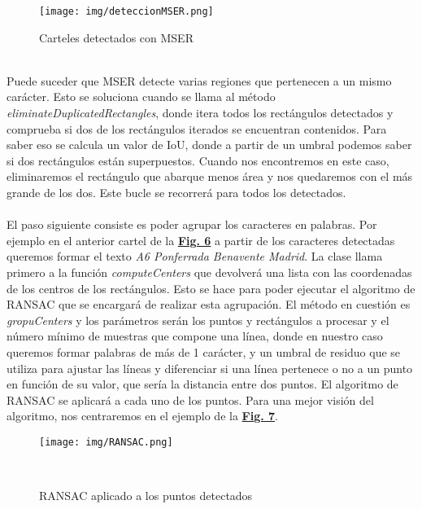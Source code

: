 \documentclass[a4paper, 12pt]{article}
\begin{document}
\begin{figure}[h]
	\centering
	\texttt{[image: img/deteccionMSER.png]}
 	\caption{Carteles detectados con MSER}\vspace{0.5cm}
	\label{fig:normalizacion}
\end{figure}
\\Puede suceder que MSER detecte varias regiones que pertenecen a un mismo carácter. Esto se soluciona cuando se llama al método \textit{eliminateDuplicatedRectangles}, donde itera todos los rectángulos detectados y comprueba si dos de los rectángulos iterados se encuentran contenidos. Para saber eso se calcula un valor de IoU, donde a partir de un umbral podemos saber si dos rectángulos están superpuestos. Cuando nos encontremos en este caso, eliminaremos el rectángulo que abarque menos área y nos quedaremos con el más grande de los dos. Este bucle se recorrerá para todos los detectados.
\\\\
El paso siguiente consiste es poder agrupar los caracteres en palabras. Por ejemplo en el anterior cartel de la \textbf{\hyperref[fig:normalizacion]{Fig. 6}} a partir de los caracteres detectadas queremos formar el texto \textit{A6 Ponferrada Benavente Madrid}. La clase llama primero a la función \textit{computeCenters} que devolverá una lista con las coordenadas de los centros de los rectángulos. Esto se hace para poder ejecutar el algoritmo de RANSAC que se encargará de realizar esta agrupación. El método en cuestión es \textit{gropuCenters} y los parámetros serán los puntos y rectángulos a procesar y el número mínimo de muestras que compone una línea, donde en nuestro caso queremos formar palabras de más de 1 carácter, y un umbral de residuo que se utiliza para ajustar las líneas y diferenciar si una línea pertenece o no a un punto en función de su valor, que sería la distancia entre dos puntos. El algoritmo de RANSAC se aplicará a cada uno de los puntos. Para una mejor visión del algoritmo, nos centraremos en el ejemplo de la \textbf{\hyperref[fig:normalizacion]{Fig. 7}}.
\begin{figure}[h]
	\centering
	\texttt{[image: img/RANSAC.png]}
 	\caption{RANSAC aplicado a los puntos detectados}\
	\label{fig:normalizacion}
\end{figure}
\end{document}
